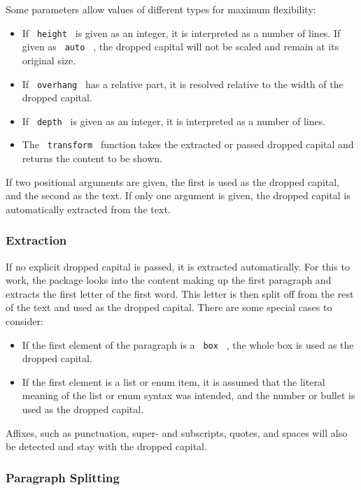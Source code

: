 Some parameters allow values of different types for maximum flexibility:

\begin{itemize}
\tightlist
\item
  If \texttt{\ height\ } is given as an integer, it is interpreted as a
  number of lines. If given as \texttt{\ auto\ } , the dropped capital
  will not be scaled and remain at its original size.
\item
  If \texttt{\ overhang\ } has a relative part, it is resolved relative
  to the width of the dropped capital.
\item
  If \texttt{\ depth\ } is given as an integer, it is interpreted as a
  number of lines.
\item
  The \texttt{\ transform\ } function takes the extracted or passed
  dropped capital and returns the content to be shown.
\end{itemize}

If two positional arguments are given, the first is used as the dropped
capital, and the second as the text. If only one argument is given, the
dropped capital is automatically extracted from the text.

\subsubsection{Extraction}\label{extraction}

If no explicit dropped capital is passed, it is extracted automatically.
For this to work, the package looks into the content making up the first
paragraph and extracts the first letter of the first word. This letter
is then split off from the rest of the text and used as the dropped
capital. There are some special cases to consider:

\begin{itemize}
\tightlist
\item
  If the first element of the paragraph is a \texttt{\ box\ } , the
  whole box is used as the dropped capital.
\item
  If the first element is a list or enum item, it is assumed that the
  literal meaning of the list or enum syntax was intended, and the
  number or bullet is used as the dropped capital.
\end{itemize}

Affixes, such as punctuation, super- and subscripts, quotes, and spaces
will also be detected and stay with the dropped capital.

\subsubsection{Paragraph Splitting}\label{paragraph-splitting}

